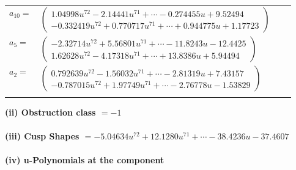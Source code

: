 \documentclass[1p]{elsarticle_modified}
\theoremstyle{definition}
\begin{document}
\begin{tabular}{m{7pt} m{180pt} m{7pt} m{180pt} }
\flushright $a_{10}=$&$\begin{pmatrix}1.04998 u^{72}-2.14441 u^{71}+\cdots-0.274455 u+9.52494\\-0.332419 u^{72}+0.770717 u^{71}+\cdots+0.944775 u+1.17723\end{pmatrix}$ \\
\flushright $a_{5}=$&$\begin{pmatrix}-2.32714 u^{72}+5.56801 u^{71}+\cdots-11.8243 u-12.4425\\1.62628 u^{72}-4.17318 u^{71}+\cdots+13.8386 u+5.94494\end{pmatrix}$ \\
\flushright $a_{2}=$&$\begin{pmatrix}0.792639 u^{72}-1.56032 u^{71}+\cdots-2.81319 u+7.43157\\-0.787015 u^{72}+1.97749 u^{71}+\cdots-2.76778 u-1.53829\end{pmatrix}$\\&\end{tabular}
\flushleft \textbf{(ii) Obstruction class $= -1$}\\~\\
\flushleft \textbf{(iii) Cusp Shapes $= -5.04634 u^{72}+12.1280 u^{71}+\cdots-38.4236 u-37.4607$}\\~\\
\newpage\renewcommand{\arraystretch}{1}
\flushleft \textbf{(iv) u-Polynomials at the component}\newline \\
\end{document}
